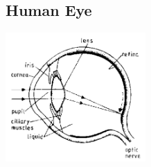 \begin{multicols}{2}
%
%

\subsection{Human Eye}

\begin{center}
\includegraphics[width=0.4\textwidth]{./img/source/human-eye.png}
\end{center}


\end{multicols}
